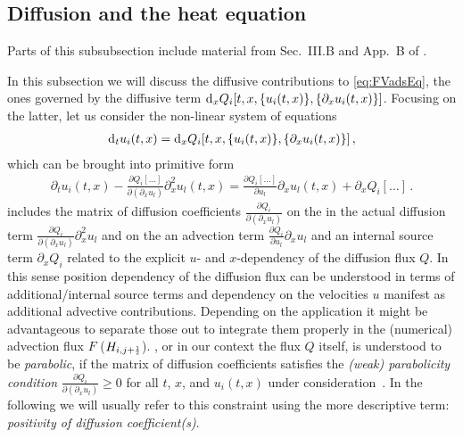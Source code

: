 \subsection{Diffusion and the heat equation}\label{subsec:hydroDiffusion}
\begin{disclaimer}
	Parts of this subsubsection include material from Sec.~III.B and App.~B of .
\end{disclaimer}
In this subsection we will discuss the diffusive contributions to \cref{eq:FVadsEq}, \viz{} the ones governed by the diffusive term $\difx\! Q_i [ t, x, \{u_i ( t, x )\}, \{\partial_x u_i ( t, x )\} ]$.
Focusing on the latter, let us consider the non-linear system of equations
\begin{align}
	\dift\! u_i ( t, x )=\difx\! Q_i [ t, x, \{u_i ( t, x )\}, \{\partial_x u_i ( t, x )\} ]\,,\label{eq:FVadsEqQonly}
\end{align}
which can be brought into primitive form
\begin{align}
	\partial_t u_i ( t, x )-\frac{\partial Q_i [ \ldots ]}{\partial (\partial_x u_l)} \partial_x^2 u_l(t,x) = \frac{\partial Q_i [\ldots]}{\partial u_l} \partial_x u_l(t,x) +\partial_x Q_i [\ldots]\,.\label{eq:FVQprimitive}
\end{align}
 includes the matrix of diffusion coefficients $\frac{\partial Q_i}{\partial (\partial_x u_l)}$ on the \lhs{} in the actual diffusion term $\frac{\partial Q_i}{\partial (\partial_x u_l)} \partial_x^2 u_l$ and on the \rhs{} an advection term $\frac{\partial Q_i}{\partial u_l} \partial_x u_l$ and an internal source term $\partial_x Q_i$ related to the explicit $u$- and $x$-dependency of the diffusion flux $Q$.
In this sense position dependency of the diffusion flux can be understood in terms of additional/internal source terms and dependency on the velocities $u$ manifest as additional advective contributions.
Depending on the application it might be advantageous to separate those out to integrate them properly in the (numerical) advection flux $F$ ($H_{i,j+\ttfrac{1}{2}}$).
, or in our context the flux $Q$ itself, is understood to be \textit{parabolic}, if the matrix of diffusion coefficients satisfies the \textit{(weak) parabolicity condition} $\frac{\partial Q_i}{\partial (\partial_x u_l)}\ge 0$ for all $t$, $x$, and $u_i ( t, x )$ under consideration~\cite{KTO2-0}.
In the following we will usually refer to this constraint using the more descriptive term: \textit{positivity of diffusion coefficient(s)}.
